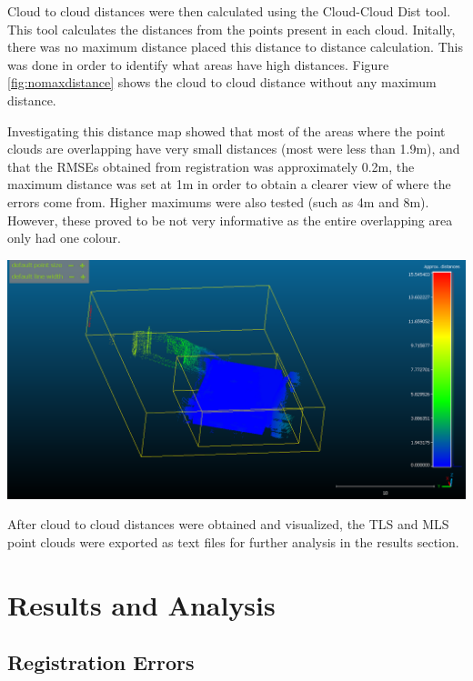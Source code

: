 \documentclass[man]{apa7}
\begin{document}
Cloud to cloud distances were then calculated using the Cloud-Cloud Dist tool. This tool calculates the distances from the points present in each cloud. Initally, there was no maximum distance placed this distance to distance calculation. This was done in order to identify what areas have high distances. Figure \ref{fig:nomaxdistance} shows the cloud to cloud distance without any maximum distance. 


Investigating this distance map showed that most of the areas where the point clouds are overlapping have very small distances (most were less than 1.9m), and that the RMSEs obtained from registration was approximately 0.2m, the maximum distance was set at 1m in order to obtain a clearer view of where the errors come from. Higher maximums were also tested (such as 4m and 8m). However, these proved to be not very informative as the entire overlapping area only had one colour.

\begin{minipage}{\linewidth}
  \includegraphics[height=\textheight/2 ,width=\textwidth/1]{figures/noMaxDistance.png}
  \label{fig:nomaxdistance}
\end{minipage}

After cloud to cloud distances were obtained and visualized, the TLS and MLS point clouds were exported as text files for further analysis in the results section. 
\newpage
\section{Results and Analysis}

\subsection{Registration Errors}
\end{document}
